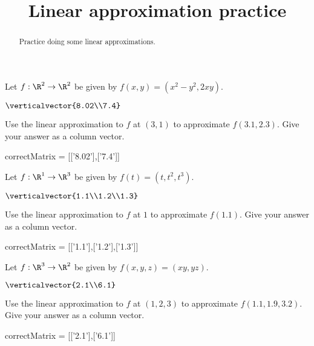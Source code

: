 \documentclass{ximera}
\title{Linear approximation practice}
\begin{document}
	\begin{abstract}
		Practice doing some linear approximations.
	\end{abstract}
	
	\begin{question}
		Let $f:\R^2 \to \R^2$ be given by $f(x,y) = (x^2-y^2,2xy)$.
		\begin{solution}
			\begin{hint}
				$\verticalvector{8.02\\7.4}$
			\end{hint}
			Use the linear approximation to $f$ at $(3,1)$ to approximate $f(3.1,2.3)$.  Give your answer as a column vector.
			\begin{matrix-answer}
				correctMatrix = [['8.02'],['7.4']]
			\end{matrix-answer}
		\end{solution}
	\end{question}
	
	\begin{question}
		Let $f:\R^1 \to \R^3$ be given by $f(t) = (t,t^2,t^3)$.
		\begin{solution}
			\begin{hint}
				$\verticalvector{1.1\\1.2\\1.3}$
			\end{hint}
			Use the linear approximation to $f$ at $1$ to approximate $f(1.1)$.  Give your answer as a column vector.
			\begin{matrix-answer}
				correctMatrix = [['1.1'],['1.2'],['1.3']]
			\end{matrix-answer}
		\end{solution}
	\end{question}
	
    \begin{question}
		Let $f:\R^3\to \R^2$ be given by $f(x,y,z) = (xy,yz)$.
		\begin{solution}
			\begin{hint}
				$\verticalvector{2.1\\6.1}$
			\end{hint}

			Use the linear approximation to $f$ at $(1,2,3)$ to approximate $f(1.1,1.9,3.2)$.  Give your answer as a column vector.
			\begin{matrix-answer}
				correctMatrix = [['2.1'],['6.1']]
			\end{matrix-answer}
		\end{solution}
	\end{question}	
\end{document}
